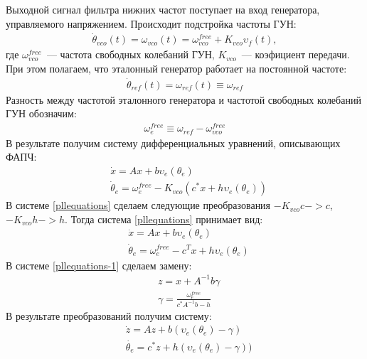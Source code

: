 \documentclass[a4paper,14pt]{article} %
\begin{document}
Выходной сигнал фильтра нижних частот поступает на вход генератора, управляемого напряжением. Происходит подстройка частоты ГУН:
 \begin{equation*}
 \begin{aligned}
\dot{\theta}_{vco}(t) = \omega_{vco}(t) = \omega^{free}_{vco} + K_{vco}\upsilon_f(t),
 \end{aligned}
\end{equation*}
где $\omega^{free}_{vco}$~--- частота свободных колебаний ГУН, $K_{vco}$~--- коэфициент передачи. При этом полагаем, что эталонный генератор работает на постоянной частоте:
 \begin{equation*}
 \begin{aligned}
\dot{\theta}_{ref}(t) = \omega_{ref}(t) \equiv \omega_{ref}
 \end{aligned}
\end{equation*}
Разность между частотой эталонного генератора и частотой свободных колебаний ГУН обозначим:
 \begin{equation*}
 \begin{aligned}
\omega_e^{free} \equiv \omega_{ref} - \omega^{free}_{vco}
 \end{aligned}
\end{equation*}
В результате получим систему дифференциальных уравнений, описывающих ФАПЧ:
 \begin{equation}\label{pllequations}
 \begin{aligned}
 &\dot{x} = Ax + b\upsilon_e(\theta_e)\\
 &\dot{\theta}_e = \omega_e^{free} - K_{vco}(c^*x + h\upsilon_e(\theta_e))
 \end{aligned}
\end{equation}
В системе \eqref{pllequations} сделаем следующие преобразования $-K_{vco}c -> c$, $-K_{vco}h -> h$. Тогда система \eqref{pllequations} принимает вид:
 \begin{equation}\label{pllequations-1}
 \begin{aligned}
 &\dot{x} = Ax + b\upsilon_e(\theta_e)\\
 &\dot{\theta}_e = \omega_e^{free} - c^Tx + h\upsilon_e(\theta_e)
 \end{aligned}
\end{equation}
В системе \eqref{pllequations-1} сделаем замену:
 \begin{equation}
 \begin{aligned}
 &z = x + A^{-1}b\gamma \\
 &\gamma = \frac{\omega_e^{free}}{c^*A^{-1}b-h}
 \end{aligned}
\end{equation}
В результате преобразований получим систему:
 \begin{equation}\label{system}
 \begin{aligned}
 &\dot{z} = Az + b(\upsilon_e(\theta_e) - \gamma)\\
 &\dot{\theta_e} = c^*z + h(\upsilon_e(\theta_e) - \gamma))
 \end{aligned}
\end{equation}
\end{document}
